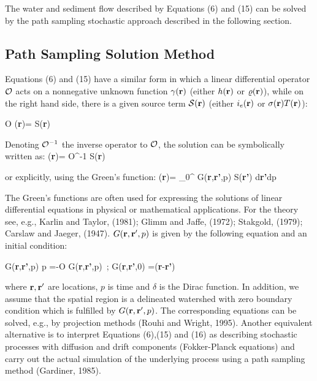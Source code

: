 \documentclass{kapedbk} %
\begin{document}
The water and sediment flow described by Equations (6) and (15)
can be solved by the path sampling stochastic approach described in the following
section.

\bigskip \medskip \noindent
\subsection{Path Sampling  Solution  Method}

\medskip
Equations (6) and (15) have a similar form in which
 a linear differential operator $\cal O$ acts on a nonnegative
unknown function
 $\gamma({\bf r})$ (either $h({\bf r})$ or $\varrho ({\bf r})$),
  while on the right hand side, there is a
given source term ${\cal S}({\bf r})$ (either $i_e({\bf r})$ or
$\sigma({\bf r})T({\bf r})$):

\leftequation
{\cal O} \gamma({\bf r})= {\cal S}({\bf r})
\endleftequation

\noindent
Denoting ${\cal O}^{-1}$ the inverse operator to ${\cal O}$,
 the solution can be symbolically written as:
\leftequation
\gamma({\bf r})=  {\cal O}^{-1} {\cal S}({\bf r})
\endleftequation

\noindent
or explicitly, using the Green's function:
\leftequation
\gamma({\bf r})=
\int_0^{\infty}\int
G({\bf r},{\bf r'},p)
 {\cal S}({\bf r'})
d{\bf r'}dp
\endleftequation

\noindent
The Green's functions are often used for expressing
the solutions of linear differential equations in
physical or mathematical applications. For the theory see, e.g.,
 Karlin and Taylor, (1981); Glimm and Jaffe, (1972);
Stakgold, (1979); Carslaw and Jaeger, (1947).
$G({\bf r},{\bf r'},p)$
is given by the following equation and an initial condition:

\leftequation
{\partial G({\bf r},{\bf r'},p)
\over \partial p} =-{\cal O} G({\bf r},{\bf r'},p)\, ;
\;\; G({\bf r},{\bf r'},0) =\delta ({\bf r}-{\bf r'})
\endleftequation

\noindent
 where ${\bf r},{\bf r'}$ are locations,
$p$ is time and $\delta$ is the Dirac function. In addition,
 we assume that the spatial region
 is a delineated watershed with zero boundary condition which is
 fulfilled by $G({\bf r},{\bf r'},p)$. The corresponding equations
 can be solved, e.g., by projection methods (Rouhi and Wright, 1995).
 Another equivalent
 alternative is to interpret Equations (6),(15) and (16) as describing
 stochastic processes with diffusion and drift components
  (Fokker-Planck equations)
 and carry out the actual simulation of the underlying process
  using a path sampling method (Gardiner, 1985).
\end{document}
